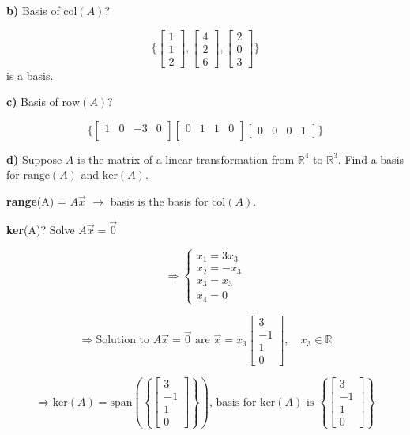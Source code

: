 \documentclass{article}
\begin{document}
\textbf{b)} Basis of \( \text{col}(A) \)?

\[ \{ \begin{bmatrix} 1 \\ 1 \\ 2 \end{bmatrix}, \begin{bmatrix} 4 \\ 2 \\ 6 \end{bmatrix}, \begin{bmatrix} 2 \\ 0 \\ 3 \end{bmatrix} \} \] is a basis.

\textbf{c)} Basis of \( \text{row}(A) \)?

\[ \{ \begin{bmatrix} 1 & 0 & -3 & 0 \\ \end{bmatrix} \begin{bmatrix}0 & 1 & 1 & 0 \\ \end{bmatrix} \begin{bmatrix}0 & 0 & 0 & 1 \end{bmatrix} \} \]

\textbf{d)} Suppose \( A \) is the matrix of a linear transformation from \( \mathbb{R}^4 \) to \( \mathbb{R}^3 \). Find a basis for \( \text{range}(A) \) and \( \text{ker}(A) \).

\textbf{range}(A) = \( A\vec{x} \) $\rightarrow$ basis is the basis for \( \text{col}(A) \).

\textbf{ker}(A)? Solve \( A\vec{x} = \vec{0} \)

\[
\Rightarrow \begin{cases} x_1 = 3x_3 \\ x_2 = -x_3 \\ x_3 = x_3 \\ x_4 = 0 \end{cases}
\]

\[
\Rightarrow \text{Solution to } A\vec{x} = \vec{0} \text{ are } \vec{x} = x_3 \begin{bmatrix} 3 \\ -1 \\ 1 \\ 0 \end{bmatrix}, \quad x_3 \in \mathbb{R}
\]

\[
\Rightarrow \text{ker}(A) = \text{span} \left( \left\{ \begin{bmatrix} 3 \\ -1 \\ 1 \\ 0 \end{bmatrix} \right\} \right) \text{, basis for } \text{ker}(A) \text{ is } \left\{ \begin{bmatrix} 3 \\ -1 \\ 1 \\ 0 \end{bmatrix} \right\}
\]
\end{document}
